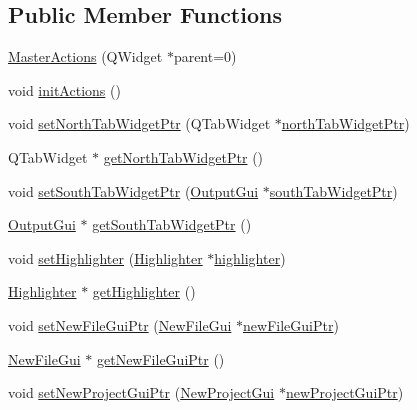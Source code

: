 \subsection*{Public Member Functions}
\begin{DoxyCompactItemize}
\item 
\hyperlink{class_master_actions_ad8eb348b90e75f5876c30692930a2c22}{Master\-Actions} (Q\-Widget $\ast$parent=0)
\item 
void \hyperlink{class_master_actions_a9e2ff3903452d1212d530e20af9d7936}{init\-Actions} ()
\item 
void \hyperlink{class_master_actions_ab831fe700bf1327e6cde36f9272ecc11}{set\-North\-Tab\-Widget\-Ptr} (Q\-Tab\-Widget $\ast$\hyperlink{class_master_actions_a4fbb50c5700fd6b66ace4cff6d3bde3e}{north\-Tab\-Widget\-Ptr})
\item 
Q\-Tab\-Widget $\ast$ \hyperlink{class_master_actions_ac58b3c22042de182e6185e1700fa2f5e}{get\-North\-Tab\-Widget\-Ptr} ()
\item 
void \hyperlink{class_master_actions_a835def663e007647d721c2aa91d02f02}{set\-South\-Tab\-Widget\-Ptr} (\hyperlink{class_output_gui}{Output\-Gui} $\ast$\hyperlink{class_master_actions_a0cbcc4a5b82537a3f958c462bcaade46}{south\-Tab\-Widget\-Ptr})
\item 
\hyperlink{class_output_gui}{Output\-Gui} $\ast$ \hyperlink{class_master_actions_aafb5837208f5909593221be23ca3f22f}{get\-South\-Tab\-Widget\-Ptr} ()
\item 
void \hyperlink{class_master_actions_ae5856ce1f1a1d1f83622631512638dd8}{set\-Highlighter} (\hyperlink{class_highlighter}{Highlighter} $\ast$\hyperlink{class_master_actions_a50b1565db8b7780ec4e88e59953aa67b}{highlighter})
\item 
\hyperlink{class_highlighter}{Highlighter} $\ast$ \hyperlink{class_master_actions_a2b609608d4fdfe1f4abc4ba386e58923}{get\-Highlighter} ()
\item 
void \hyperlink{class_master_actions_a4fde279b855381679703cac9037deb08}{set\-New\-File\-Gui\-Ptr} (\hyperlink{class_new_file_gui}{New\-File\-Gui} $\ast$\hyperlink{class_master_actions_a8839c174acf071c0d9bfe450160218eb}{new\-File\-Gui\-Ptr})
\item 
\hyperlink{class_new_file_gui}{New\-File\-Gui} $\ast$ \hyperlink{class_master_actions_acb2a5079f7000c89fd0817db3ba46040}{get\-New\-File\-Gui\-Ptr} ()
\item 
void \hyperlink{class_master_actions_a4d26f5e2d62c71b71c4a198326b241f1}{set\-New\-Project\-Gui\-Ptr} (\hyperlink{class_new_project_gui}{New\-Project\-Gui} $\ast$\hyperlink{class_master_actions_a78733336a3d5fd3bbb55eaf0215f0d40}{new\-Project\-Gui\-Ptr})

\end{DoxyCompactItemize}
